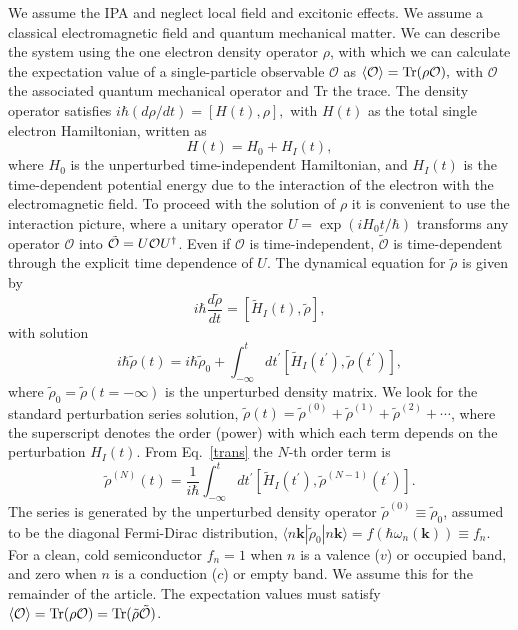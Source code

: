 \documentclass[floatfix,prb,aps,superscriptaddress,11pt,preprint,letterpaper]{revtex4}
\begin{document}
We assume the IPA and neglect local field  
and excitonic effects.  
We assume a classical electromagnetic field
and quantum mechanical matter.
We can describe the system using 
the one electron density
operator ${\rho}$, with which we can calculate the expectation value of a
single-particle observable $\mathcal{O}$ as 
$\langle{\cal O}\rangle=\mbox{Tr}({\rho} {\cal O}),  
\label{calo}$
with $\mathcal{O}$ the associated quantum mechanical operator and Tr
the trace. 
The density operator satisfies
$
i\hbar (d{\rho}/dt)=[H(t),{\rho}],  
\label{rho}
$
with $H(t)$ as the total single electron Hamiltonian, written as 
\begin{equation*}
H(t)=H_{0}+H_{I}(t),  
\label{ache}
\end{equation*}
where $H_{0}$ is the unperturbed time-independent Hamiltonian, and $H_{I}(t)$
is the time-dependent potential energy due to the interaction of the
electron with the electromagnetic field.
To proceed with the solution of $\rho$  it is convenient to use the
interaction picture, where a unitary operator $U=\exp ({iH_{0}t/\hbar })$
transforms any operator $\mathcal{O}$ into 
$\tilde{\mathcal{O}}=U{\cal O}U^{\dagger }$. Even if $\mathcal{O}$ 
is time-independent, 
$\tilde{\mathcal{O}}$ is time-dependent through the explicit
time dependence of $U$. 
The dynamical 
equation for $\tilde{\rho}$ is 
given by
\begin{equation*}
i\hbar \frac{d\tilde{{\rho}}}{dt}=[\tilde{H}_{I}(t),\tilde{{\rho}}],  
\label{rho1}
\end{equation*}
with solution 
\begin{equation}
i\hbar \tilde{{\rho}}(t)=i\hbar \tilde{{\rho}}_{0}+\int_{-\infty }^{t}dt^{\prime }[
\tilde{H}_{I}(t^{\prime }),\tilde{\rho}(t^{\prime })],  
\label{trans}
\end{equation}
where $\tilde{\rho}_{0}=\tilde{\rho}(t=-\infty )$ is the unperturbed density matrix. We look
for the standard perturbation series solution, 
$\tilde{\rho}(t)=\tilde{\rho}^{(0)}+\tilde{\rho}^{(1)}+\tilde{\rho}^{(2)}+\cdots$,  
where the superscript denotes the order (power) with which each term depends
on the perturbation $H_{I}(t)$. From Eq.~\eqref{trans} the $N$-th order
term is 
\begin{equation}
\tilde{{\rho}}^{(N)}(t)=\frac{1}{i\hbar }\int_{-\infty }^{t}dt^{\prime }[\tilde{
H}_{I}(t^{\prime }),\tilde{\rho}^{(N-1)}(t^{\prime })].  
\label{rhop}
\end{equation}
The series is generated by the unperturbed density operator $\tilde{\rho}
^{(0)}\equiv \tilde{\rho}_{0}$, assumed to be the diagonal Fermi-Dirac distribution, 
$\langle n\mathbf{k}|\tilde{\rho}_{0}|n\mathbf{k}\rangle=f(\hbar \omega_{n}(\mathbf{k}))\equiv f_{n}$. For a
clean, cold semiconductor $f_{n}=1$ when $n$ is a valence ($v$) or
occupied band, and zero when $n$ is a conduction ($c$) or empty band.
We assume this for the remainder of the article.
The expectation values must satisfy
$
\langle{\cal O}\rangle=
\mbox{Tr}({\rho}{\cal O})
=
\mbox{Tr}(\tilde{{\rho}}\tilde{\cal O})
$.  
\end{document}
